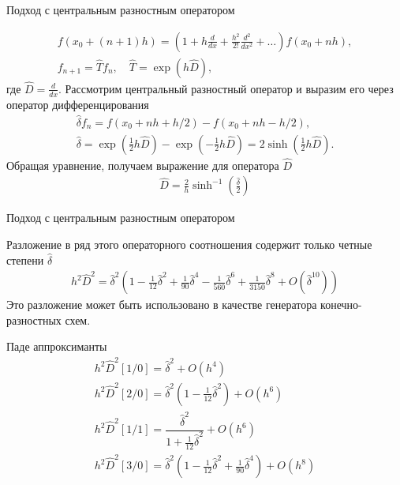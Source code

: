 \documentclass[10pt,pdf,hyperref={unicode},xcolor=dvipsnames]{beamer}
\newcommand{\lb}{\left(}
\newcommand{\rb}{\right)}
\newcommand{\hD}{\hat{D}}
\begin{document}
\begin{frame}{Подход с центральным разностным оператором }
    \vspace*{-0.5cm}
    \begin{block}{}
        \begin{gather}
            f(x_0 + (n+1)h) = \lb 1 + h \frac{d}{dx} + \frac{h^2}{2!} \frac{d^2}{dx^2} + \dots \rb f(x_0 + nh), \\ 
            f_{n+1} = \hat{T} f_n, \quad \hat{T} = \exp \lb h \hat{D} \rb, 
        \end{gather}
        где $\displaystyle \hat{D} = \frac{d}{dx}$. Рассмотрим центральный разностный оператор и выразим его через оператор дифференцирования
        \begin{gather}
            \hat{\delta} f_n = f(x_0 + nh + h/2) - f(x_0 + nh - h/2), \\
            \hat{\delta} = \exp \lb \frac{1}{2} h \hD \rb - \exp \lb -\frac{1}{2} h \hD \rb = 2 \sinh \lb \frac{1}{2} h \hD \rb.
        \end{gather}
        Обращая уравнение, получаем выражение для оператора $\hat{D}$ 
        \begin{gather}
            \hD = \frac{2}{h} \sinh^{-1} \lb \frac{\hat{\delta}}{2} \rb
        \end{gather}
    \end{block}
\end{frame}

\begin{frame}{Подход с центральным разностным оператором}
    \vspace*{-0.5cm}
    \begin{block}{}
        Разложение в ряд этого операторного соотношения содержит только четные степени $\hat{\delta}$
        \begin{gather}
            h^2 \hD^2 = \hat{\delta}^2 \lb 1 - \frac{1}{12} \hat{\delta}^2 + \frac{1}{90} \hat{\delta}^4 - \frac{1}{560} \hat{\delta}^6 + \frac{1}{3150} \hat{\delta}^8 + O(\hat{\delta}^{10}) \rb
        \end{gather}
        Это разложение может быть использовано в качестве генератора конечно-разностных схем.
    \end{block}
    \vspace*{-0.3cm}
    \begin{block}{Паде аппроксиманты}
        \vspace*{-0.5cm}
        \begin{gather}
            h^2 \hD^2 [1/0] = \hat{\delta}^2 + O(h^4) \\
            h^2 \hD^2 [2/0] = \hat{\delta}^2 \lb 1 - \frac{1}{12} \hat{\delta}^2 \rb + O(h^6) \\
            h^2 \hD^2 [1/1] = \dfrac{\hat{\delta}^2}{1 + \frac{1}{12} \hat{\delta}^2} + O(h^6) \\
            h^2 \hD^2 [3/0] = \hat{\delta}^2 \lb 1 - \frac{1}{12} \hat{\delta}^2 + \frac{1}{90} \hat{\delta}^4 \rb + O(h^8)
        \end{gather}
    \end{block}
\end{frame}
\end{document}
